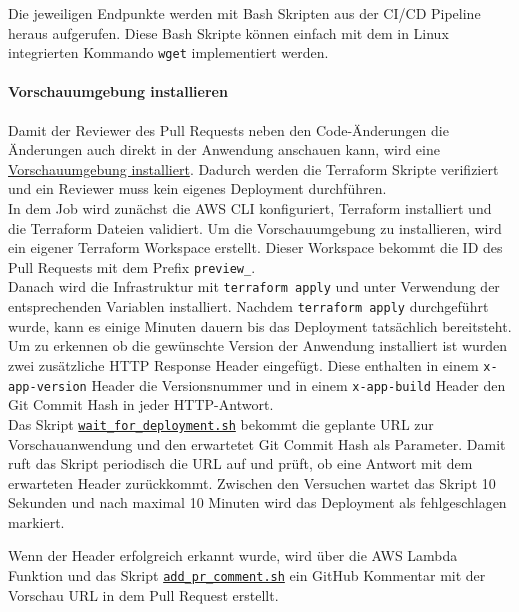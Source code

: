Die jeweiligen Endpunkte werden mit Bash Skripten aus der CI/CD Pipeline heraus aufgerufen.
Diese Bash Skripte können einfach mit dem in Linux integrierten Kommando \texttt{wget} implementiert werden.

\paragraph{Vorschauumgebung installieren}

Damit der Reviewer des Pull Requests neben den Code-Änderungen die Änderungen auch direkt in der Anwendung anschauen kann, wird eine \hyperref[lst:circle_job_deploy_preview]{Vorschauumgebung installiert}.
Dadurch werden die Terraform Skripte verifiziert und ein Reviewer muss kein eigenes Deployment durchführen. \\

In dem Job wird zunächst die AWS CLI konfiguriert, Terraform installiert und die Terraform Dateien validiert.
Um die Vorschauumgebung zu installieren, wird ein eigener Terraform Workspace erstellt.
Dieser Workspace bekommt die ID des Pull Requests mit dem Prefix \texttt{preview\_}. \\

Danach wird die Infrastruktur mit \texttt{terraform apply} und unter Verwendung der entsprechenden Variablen installiert.
Nachdem \texttt{terraform apply} durchgeführt wurde, kann es einige Minuten dauern bis das Deployment tatsächlich bereitsteht. \\

Um zu erkennen ob die gewünschte Version der Anwendung installiert ist wurden zwei zusätzliche HTTP Response Header eingefügt.
Diese enthalten in einem \texttt{x-app-version} Header die Versionsnummer und in einem \texttt{x-app-build} Header den Git Commit Hash in jeder HTTP-Antwort. \\

Das Skript \hyperref[lst:scripts_wait_for_deployment]{\texttt{wait\_for\_deployment.sh}} bekommt die geplante URL zur Vorschauanwendung und den erwartetet Git Commit Hash als Parameter.
Damit ruft das Skript periodisch die URL auf und prüft, ob eine Antwort mit dem erwarteten Header zurückkommt.
Zwischen den Versuchen wartet das Skript 10 Sekunden und nach maximal 10 Minuten wird das Deployment als fehlgeschlagen markiert.

Wenn der Header erfolgreich erkannt wurde, wird über die AWS Lambda Funktion und das Skript \hyperref[lst:scripts_add_pr_comment]{\texttt{add\_pr\_comment.sh}}
ein GitHub Kommentar mit der Vorschau URL in dem Pull Request erstellt.

